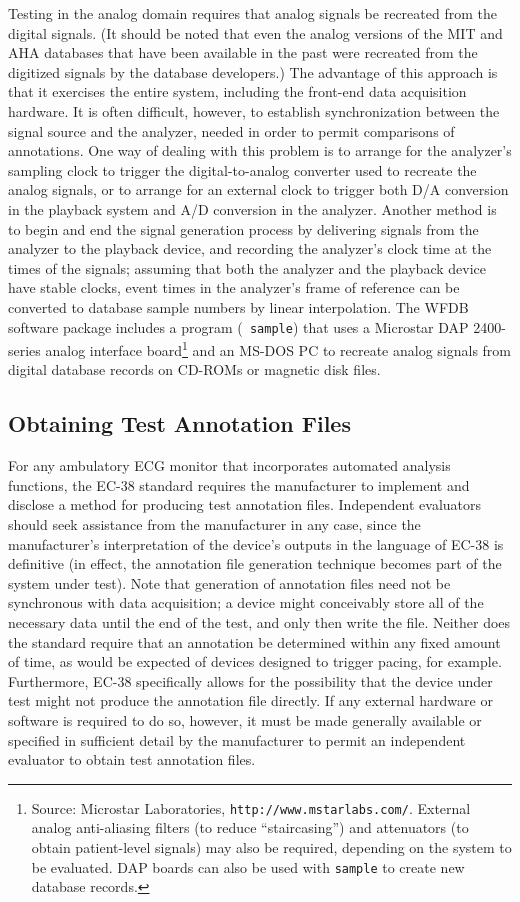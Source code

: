 \documentclass[twoside]{article}
\begin{document}
Testing in the analog domain requires that analog signals be recreated from
the digital signals.  (It should be noted that even the analog versions of the
MIT and AHA databases that have been available in the past were recreated
from the digitized signals by the database developers.)  The advantage of this
approach is that it exercises the entire system, including the front-end data
acquisition hardware.  It is often difficult, however, to establish
synchronization between the signal source and the analyzer, needed in order to
permit comparisons of annotations.  One way of dealing with this problem is to
arrange for the analyzer's sampling clock to trigger the digital-to-analog
converter used to recreate the analog signals, or to arrange for an external
clock to trigger both D/A conversion in the playback system and A/D conversion
in the analyzer.  Another method is to begin and end the signal generation
process by delivering signals from the analyzer to the playback device, and
recording the analyzer's clock time at the times of the signals; assuming that
both the analyzer and the playback device have stable clocks, event times in
the analyzer's frame of reference can be converted to database sample numbers
by linear interpolation.  The WFDB software package includes a program ({\tt
sample}) that uses a Microstar DAP 2400-series analog interface
board\footnote{
Source: Microstar Laboratories, {\tt http://www.mstarlabs.com/}. External
analog anti-aliasing filters (to reduce ``staircasing'') and attenuators (to
obtain patient-level signals) may also be required, depending on the system to
be evaluated.  DAP boards can also be used with {\tt sample} to create new
database records.}
and an MS-DOS PC to recreate analog signals from digital database records on
CD-ROMs or magnetic disk files.

\subsection{Obtaining Test Annotation Files}
For any ambulatory ECG monitor that incorporates automated analysis functions,
the EC-38 standard requires the manufacturer to implement and disclose a
method for producing test annotation files.  Independent evaluators should seek
assistance from the manufacturer in any case, since the manufacturer's
interpretation of the device's outputs in the language of EC-38 is definitive
(in effect, the annotation file generation technique becomes part of
the system under test).  Note that generation of annotation files need not be
synchronous with data acquisition; a device might conceivably store all of the
necessary data until the end of the test, and only then write the file.
Neither does the standard require that an annotation be determined within any
fixed amount of time, as would be expected of devices designed to trigger
pacing, for example.  Furthermore, EC-38 specifically allows for the
possibility that the device under test might not produce the annotation file
directly.  If any external hardware or software is required to do so, however,
it must be made generally available or specified in sufficient detail by the
manufacturer to permit an independent evaluator to obtain test annotation
files.
\end{document}

